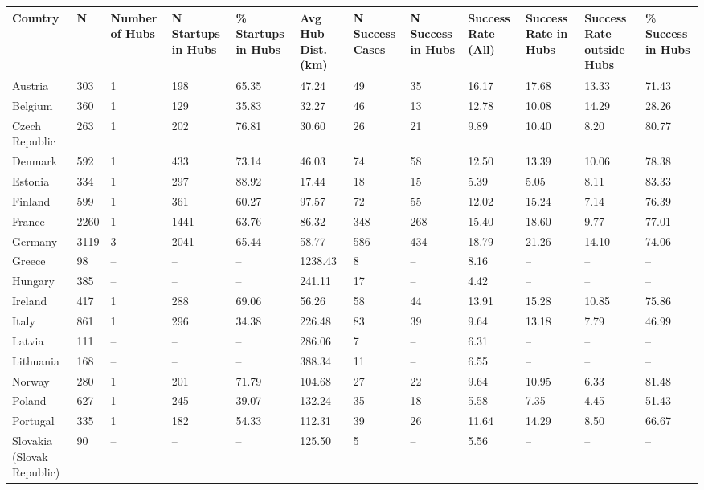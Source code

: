 \begin{tabular}{llllllllllll}
  \toprule
Country & N & Number of Hubs & N Startups in Hubs & \% Startups in Hubs & Avg Hub Dist. (km) & N Success Cases & N Success in Hubs & Success Rate (All) & Success Rate in Hubs & Success Rate outside Hubs & \% Success in Hubs \\ 
  \midrule
Austria & 303 & 1 & 198 & 65.35 & 47.24 & 49 & 35 & 16.17 & 17.68 & 13.33 & 71.43 \\ 
  Belgium & 360 & 1 & 129 & 35.83 & 32.27 & 46 & 13 & 12.78 & 10.08 & 14.29 & 28.26 \\ 
  Czech Republic & 263 & 1 & 202 & 76.81 & 30.60 & 26 & 21 & 9.89 & 10.40 & 8.20 & 80.77 \\ 
  Denmark & 592 & 1 & 433 & 73.14 & 46.03 & 74 & 58 & 12.50 & 13.39 & 10.06 & 78.38 \\ 
  Estonia & 334 & 1 & 297 & 88.92 & 17.44 & 18 & 15 & 5.39 & 5.05 & 8.11 & 83.33 \\ 
  Finland & 599 & 1 & 361 & 60.27 & 97.57 & 72 & 55 & 12.02 & 15.24 & 7.14 & 76.39 \\ 
  France & 2260 & 1 & 1441 & 63.76 & 86.32 & 348 & 268 & 15.40 & 18.60 & 9.77 & 77.01 \\ 
  Germany & 3119 & 3 & 2041 & 65.44 & 58.77 & 586 & 434 & 18.79 & 21.26 & 14.10 & 74.06 \\ 
  Greece & 98 & – & – & – & 1238.43 & 8 & – & 8.16 & – & – & – \\ 
  Hungary & 385 & – & – & – & 241.11 & 17 & – & 4.42 & – & – & – \\ 
  Ireland & 417 & 1 & 288 & 69.06 & 56.26 & 58 & 44 & 13.91 & 15.28 & 10.85 & 75.86 \\ 
  Italy & 861 & 1 & 296 & 34.38 & 226.48 & 83 & 39 & 9.64 & 13.18 & 7.79 & 46.99 \\ 
  Latvia & 111 & – & – & – & 286.06 & 7 & – & 6.31 & – & – & – \\ 
  Lithuania & 168 & – & – & – & 388.34 & 11 & – & 6.55 & – & – & – \\ 
  Norway & 280 & 1 & 201 & 71.79 & 104.68 & 27 & 22 & 9.64 & 10.95 & 6.33 & 81.48 \\ 
  Poland & 627 & 1 & 245 & 39.07 & 132.24 & 35 & 18 & 5.58 & 7.35 & 4.45 & 51.43 \\ 
  Portugal & 335 & 1 & 182 & 54.33 & 112.31 & 39 & 26 & 11.64 & 14.29 & 8.50 & 66.67 \\ 
  Slovakia (Slovak Republic) & 90 & – & – & – & 125.50 & 5 & – & 5.56 & – & – & – \\ 

\end{tabular}
